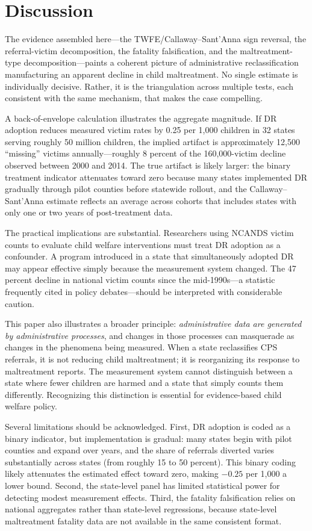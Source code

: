 \documentclass[12pt]{article}
\begin{document}
\section{Discussion}

The evidence assembled here---the TWFE/Callaway--Sant'Anna sign reversal, the referral-victim decomposition, the fatality falsification, and the maltreatment-type decomposition---paints a coherent picture of administrative reclassification manufacturing an apparent decline in child maltreatment. No single estimate is individually decisive. Rather, it is the triangulation across multiple tests, each consistent with the same mechanism, that makes the case compelling.

A back-of-envelope calculation illustrates the aggregate magnitude. If DR adoption reduces measured victim rates by 0.25 per 1,000 children in 32 states serving roughly 50 million children, the implied artifact is approximately 12,500 ``missing'' victims annually---roughly 8 percent of the 160,000-victim decline observed between 2000 and 2014. The true artifact is likely larger: the binary treatment indicator attenuates toward zero because many states implemented DR gradually through pilot counties before statewide rollout, and the Callaway--Sant'Anna estimate reflects an average across cohorts that includes states with only one or two years of post-treatment data.

The practical implications are substantial. Researchers using NCANDS victim counts to evaluate child welfare interventions must treat DR adoption as a confounder. A program introduced in a state that simultaneously adopted DR may appear effective simply because the measurement system changed. The 47 percent decline in national victim counts since the mid-1990s---a statistic frequently cited in policy debates---should be interpreted with considerable caution.

This paper also illustrates a broader principle: \textit{administrative data are generated by administrative processes}, and changes in those processes can masquerade as changes in the phenomena being measured. When a state reclassifies CPS referrals, it is not reducing child maltreatment; it is reorganizing its response to maltreatment reports. The measurement system cannot distinguish between a state where fewer children are harmed and a state that simply counts them differently. Recognizing this distinction is essential for evidence-based child welfare policy.

Several limitations should be acknowledged. First, DR adoption is coded as a binary indicator, but implementation is gradual: many states begin with pilot counties and expand over years, and the share of referrals diverted varies substantially across states (from roughly 15 to 50 percent). This binary coding likely attenuates the estimated effect toward zero, making $-0.25$ per 1,000 a lower bound. Second, the state-level panel has limited statistical power for detecting modest measurement effects. Third, the fatality falsification relies on national aggregates rather than state-level regressions, because state-level maltreatment fatality data are not available in the same consistent format.
\end{document}
